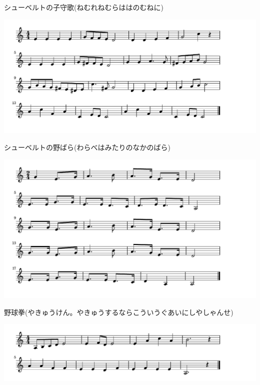\documentclass[a4paper]{ltjsarticle}
\begin{document}
\vspace{-10mm} \hspace{10mm}
シューベルトの子守歌(ねむれねむらははのむねに)

\includegraphics[clip]{schubertnobara_crop.pdf}

\vspace{-10mm} \hspace{10mm}
シューベルトの野ばら(わらべはみたりのなかのばら)

\includegraphics[clip]{yakyuken_crop.pdf}

\vspace{-10mm} \hspace{10mm}
野球拳(やきゅうけん。やきゅうするならこういうぐあいにしやしゃんせ)

\includegraphics[clip]{akaikutsu_crop.pdf}
\end{document}
